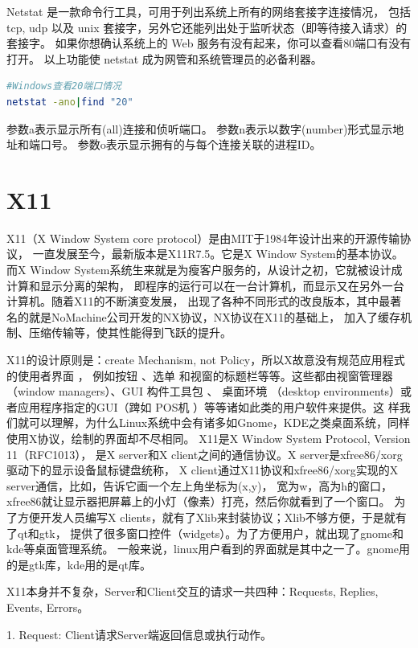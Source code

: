 \documentclass{book}
\begin{document}
Netstat 是一款命令行工具，可用于列出系统上所有的网络套接字连接情况，
包括 tcp, udp 以及 unix 套接字，另外它还能列出处于监听状态（即等待接入请求）的套接字。
如果你想确认系统上的 Web 服务有没有起来，你可以查看80端口有没有打开。
以上功能使 netstat 成为网管和系统管理员的必备利器。

\begin{lstlisting}[language=Bash]
#Windows查看20端口情况
netstat -ano|find "20"
\end{lstlisting}

参数a表示显示所有(all)连接和侦听端口。
参数n表示以数字(number)形式显示地址和端口号。
参数o表示显示拥有的与每个连接关联的进程ID。

\section{X11}

X11（X Window System core protocol）是由MIT于1984年设计出来的开源传输协议，
一直发展至今，最新版本是X11R7.5。它是X Window System的基本协议。
而X Window System系统生来就是为瘦客户服务的，从设计之初，它就被设计成计算和显示分离的架构，
即程序的运行可以在一台计算机，而显示又在另外一台计算机。随着X11的不断演变发展，
出现了各种不同形式的改良版本，其中最著名的就是NoMachine公司开发的NX协议，NX协议在X11的基础上，
加入了缓存机制、压缩传输等，使其性能得到飞跃的提升。

X11的设计原则是：create Mechanism, not Policy，所以X故意没有规范应用程式的使用者界面 ，
例如按钮 、选单 和视窗的标题栏等等。这些都由视窗管理器 （window managers）、GUI 构件工具包 、
桌面环境 （desktop environments）或者应用程序指定的GUI（䠋如 POS机 ）等等诸如此类的用户软件来提供。这
样我们就可以理解，为什么Linux系统中会有诸多如Gnome，KDE之类桌面系统，同样使用X协议，绘制的界面却不尽相同。
X11是X Window System Protocol, Version 11（RFC1013），
是X server和X client之间的通信协议。X server是xfree86/xorg驱动下的显示设备鼠标键盘统称，
X client通过X11协议和xfree86/xorg实现的X server通信，比如，告诉它画一个左上角坐标为(x,y)，
宽为w，高为h的窗口，xfree86就让显示器把屏幕上的小灯（像素）打亮，然后你就看到了一个窗口。
为了方便开发人员编写X clients，就有了Xlib来封装协议；Xlib不够方便，于是就有了qt和gtk，
提供了很多窗口控件（widgets）。为了方便用户，就出现了gnome和kde等桌面管理系统。
一般来说，linux用户看到的界面就是其中之一了。gnome用的是gtk库，kde用的是qt库。

X11本身并不复杂，Server和Client交互的请求一共四种：Requests, Replies, Events, Errors。

1. Request: Client请求Server端返回信息或执行动作。
\end{document}
